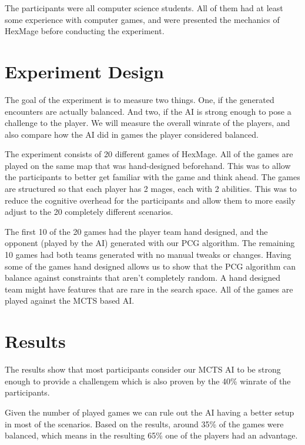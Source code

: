 The participants were all computer science students. All of them had at least
some experience with computer games, and were presented the mechanics of HexMage
before conducting the experiment.

\section{Experiment Design}

The goal of the experiment is to measure two things. One, if the generated
encounters are actually balanced. And two, if the AI is strong enough to pose a
challenge to the player. We will measure the overall winrate of the players,
and also compare how the AI did in games the player considered balanced.

The experiment consists of 20 different games of HexMage. All of the games are
played on the same map that was hand-designed beforehand. This was to allow the
participants to better get familiar with the game and think ahead. The games
are structured so that each player has 2 mages, each with 2 abilities. This was
to reduce the cognitive overhead for the participants and allow them to more easily
adjust to the 20 completely different scenarios.

The first 10 of the 20 games had the player team hand designed, and the
opponent (played by the AI) generated with our PCG algorithm. The remaining 10
games had both teams generated with no manual tweaks or changes. Having some of
the games hand designed allows us to show that the PCG algorithm can balance
against constraints that aren't completely random. A hand designed team might
have features that are rare in the search space. All of the games are played
against the MCTS based AI\@.

\section{Results}


The results show that most participants consider our MCTS AI to be strong
enough to provide a challengem which is also proven by the 40\% winrate of
the participants. 

Given the number of played games  we can
rule out the AI having a better setup in most of the scenarios. Based on the
results, around 35\%  of the games were balanced,
which means in the resulting 65\% one of the players had an advantage.

